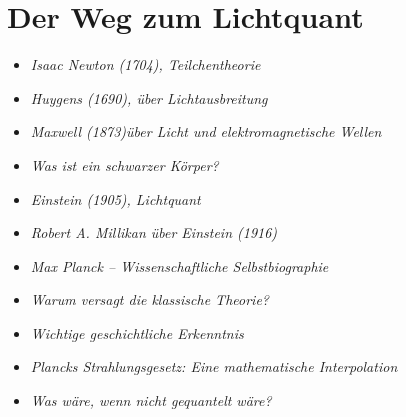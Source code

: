 \section{Der Weg zum Lichtquant}
\medskip
\begin{tcolorbox}[title=physikalische Boxen,physikbox]
\begin{itemize}
	\item \emph{Isaac Newton (1704), Teilchentheorie} \dotfill\pageref{box:newton}
	\item \emph{Huygens (1690), über Lichtausbreitung}\dotfill\pageref{box:huygens}
	\item \emph{Maxwell (1873)über Licht und  elektromagnetische Wellen} \dotfill\pageref{box:maxwell}
	\item \emph{Was ist ein schwarzer Körper?} \dotfill\pageref{box:schwarzerkoerper}
	\item \emph{Einstein (1905), Lichtquant}\dotfill\pageref{box:einstein-lichtquant}
	\item \emph{Robert A. Millikan über Einstein (1916)} \dotfill\pageref{box:millikan-einstein}
	\item \emph{Max Planck – Wissenschaftliche Selbstbiographie}\dotfill\pageref{box:planck-zitat}
\end{itemize}
\end{tcolorbox}

\medskip
\begin{tcolorbox}[title=didaktische Boxen,didaktikbox]
\begin{itemize}
	\item \emph{Warum versagt die klassische Theorie?} \dotfill\pageref{box:klassik-versagt}
	\item \emph{Wichtige geschichtliche Erkenntnis} \dotfill\pageref{box:geschichte-planck}
\end{itemize}
\end{tcolorbox}

\medskip
\begin{tcolorbox}[title=mathematische Boxen,mathebox]
\begin{itemize}
	\item \emph{Plancks Strahlungsgesetz: Eine mathematische Interpolation}\dotfill\pageref{box:planck-interpolation}
\end{itemize}
\end{tcolorbox}

\medskip
\begin{tcolorbox}[title=hypothetische Boxen,hypobox]
\begin{itemize}
	\item \emph{Was wäre, wenn nicht gequantelt wäre?} \dotfill\pageref{box:hypo-keine-quanten}
\end{itemize}
\end{tcolorbox}


